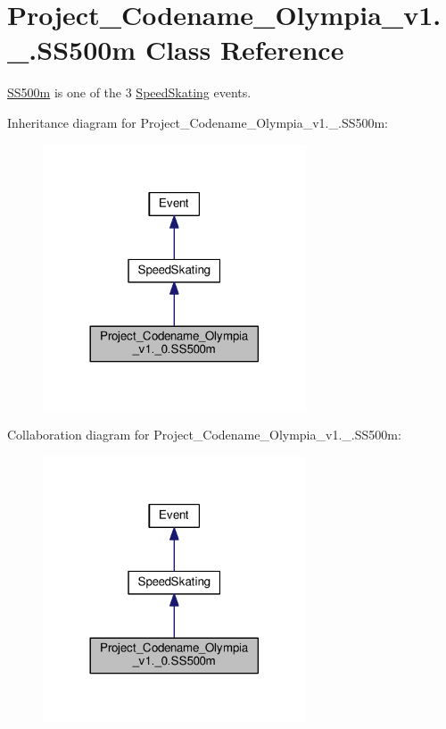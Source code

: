 \hypertarget{classProject__Codename__Olympia__v1_1_1__0_1_1SS500m}{}\section{Project\+\_\+\+Codename\+\_\+\+Olympia\+\_\+v1.\+\_.\+S\+S500m Class Reference}
\label{classProject__Codename__Olympia__v1_1_1__0_1_1SS500m}


\hyperlink{classProject__Codename__Olympia__v1_1_1__0_1_1SS500m}{S\+S500m} is one of the 3 \hyperlink{classProject__Codename__Olympia__v1_1_1__0_1_1SpeedSkating}{Speed\+Skating} events.  




Inheritance diagram for Project\+\_\+\+Codename\+\_\+\+Olympia\+\_\+v1.\+\_.\+S\+S500m\+:
\nopagebreak
\begin{figure}[H]
\begin{center}
\leavevmode
\includegraphics[width=221pt]{classProject__Codename__Olympia__v1_1_1__0_1_1SS500m__inherit__graph}
\end{center}
\end{figure}


Collaboration diagram for Project\+\_\+\+Codename\+\_\+\+Olympia\+\_\+v1.\+\_.\+S\+S500m\+:
\nopagebreak
\begin{figure}[H]
\begin{center}
\leavevmode
\includegraphics[width=221pt]{classProject__Codename__Olympia__v1_1_1__0_1_1SS500m__coll__graph}
\end{center}
\end{figure}

